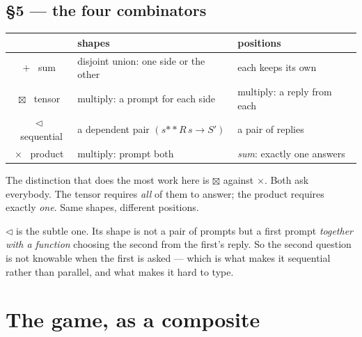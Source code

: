 \documentclass[11pt,a4paper]{article}
\begin{document}
\subsection{\S5 --- the four combinators}

\begin{center}
\footnotesize
\begin{tabular}{@{}cll@{}}
\toprule
& \textbf{shapes} & \textbf{positions} \\
\midrule
$+$ \ sum        & disjoint union: one side or the other & each keeps its own \\
$\boxtimes$ \ tensor  & multiply: a prompt for each side  & multiply: a reply from each \\
$\lhd$ \ sequential   & a dependent pair $(s \mathbin{**} R\,s \to S')$ & a pair of replies \\
$\times$ \ product    & multiply: prompt both              & \emph{sum}: exactly one answers \\
\bottomrule
\end{tabular}
\end{center}

\noindent The distinction that does the most work here is $\boxtimes$ against
$\times$. Both ask everybody. The tensor requires \emph{all} of them to answer;
the product requires exactly \emph{one}. Same shapes, different positions.

$\lhd$ is the subtle one. Its shape is not a pair of prompts but a first prompt
\emph{together with a function} choosing the second from the first's reply. So
the second question is not knowable when the first is asked --- which is what
makes it sequential rather than parallel, and what makes it hard to type.

\section{The game, as a composite}
\end{document}
